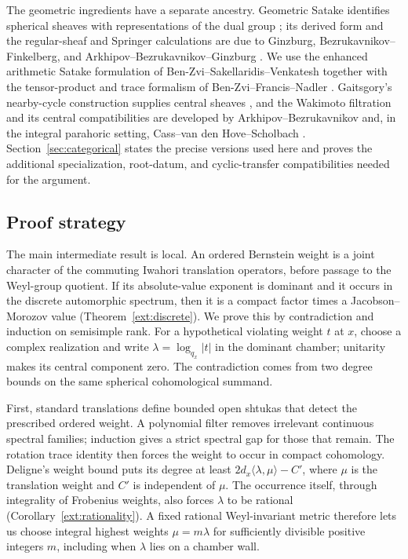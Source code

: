 The geometric ingredients have a separate ancestry. Geometric Satake
identifies spherical sheaves with representations of the dual group
\cite{MV}; its derived form and the regular-sheaf and Springer
calculations are due to Ginzburg, Bezrukavnikov--Finkelberg, and
Arkhipov--Bezrukavnikov--Ginzburg \cite{GinzburgLoop,BF,ABG}.
We use the enhanced arithmetic Satake formulation of
Ben-Zvi--Sakellaridis--Venkatesh \cite{BZSV} together with the
tensor-product and trace formalism of Ben-Zvi--Francis--Nadler
\cite{BFN}.
Gaitsgory's nearby-cycle construction supplies central sheaves
\cite{GaitsgoryCentral}, and the Wakimoto filtration and its central
compatibilities are developed by Arkhipov--Bezrukavnikov and, in the
integral parahoric setting, Cass--van den Hove--Scholbach
\cite{AB,CvdHS}. Section~\ref{sec:categorical} states the precise
versions used here and proves the additional specialization,
root-datum, and cyclic-transfer compatibilities needed for the argument.

\subsection{Proof strategy}

The main intermediate result is local. An ordered Bernstein weight is
a joint character of the commuting Iwahori translation operators,
before passage to the Weyl-group quotient. If its absolute-value
exponent is dominant and it occurs in the discrete automorphic
spectrum, then it is a compact
factor times a Jacobson--Morozov value
(Theorem~\ref{ext:discrete}). We prove this by contradiction and
induction on semisimple rank. For a hypothetical violating weight \(t\)
at \(x\), choose a complex realization and write
\(\lambda=\log_{q_x}|t|\) in the dominant chamber; unitarity makes
its central component zero. The contradiction comes from two degree bounds on
the same spherical cohomological summand.

First, standard translations define bounded open shtukas that detect
the prescribed ordered weight. A polynomial filter removes irrelevant
continuous spectral families; induction gives a strict spectral gap
for those that remain. The rotation trace identity then forces the
weight to occur in compact cohomology. Deligne's weight bound puts its
degree at least
\(2d_x\langle\lambda,\mu\rangle-C'\), where \(\mu\) is the
translation weight and \(C'\) is independent of \(\mu\).
The occurrence itself, through integrality of Frobenius weights, also
forces \(\lambda\) to be rational
(Corollary~\ref{ext:rationality}). A fixed rational Weyl-invariant
metric therefore lets us choose integral highest weights
\(\mu=m\lambda\) for sufficiently divisible positive integers \(m\),
including when \(\lambda\) lies on a chamber wall.

